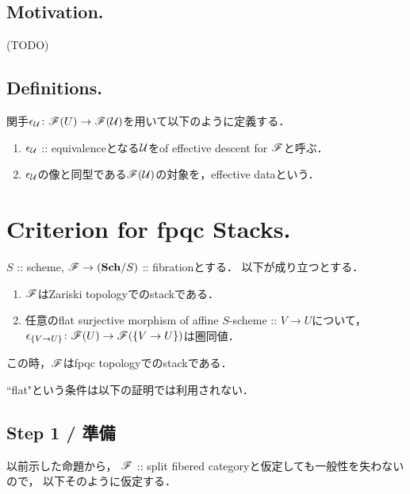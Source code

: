 \documentclass[a4paper, dvipdfmx]{jsarticle}
\begin{document}
\subsection{Motivation.}
    (TODO)

\subsection{Definitions.}
\begin{Def}
    関手$\epsilon_{\mathcal{U}} \colon \mathscr{F}(U) \to \mathscr{F}(\mathcal{U})$を用いて以下のように定義する．
    \begin{enumerate}[label=(\roman*)]
        \item
            $\epsilon_{\mathcal{U}}$ :: equivalenceとなる$\mathcal{U}$をof effective descent for $\mathscr{F}$と呼ぶ．
        \item
            $\epsilon_{\mathcal{U}}$の像と同型である$\mathscr{F}(\mathcal{U})$の対象を，effective dataという．
    \end{enumerate}
\end{Def}

\section{Criterion for fpqc Stacks.}
\begin{Thm}\label{thm:fpqccriterion}
    $S$ :: scheme,
    $\mathscr{F} \to (\mathbf{Sch}/S)$ :: fibrationとする．
    以下が成り立つとする．
    \begin{enumerate}[label=(\alph*)]
        \item $\mathscr{F}$はZariski topologyでのstackである．
        \item
            任意のflat surjective morphism of affine $S$-scheme :: $V \to U$について，\mnewline
            $\epsilon_{\{V \to U\}} \colon \mathscr{F}(U) \to \mathscr{F}(\{V \to U\})$は圏同値．
    \end{enumerate}
    この時，$\mathscr{F}$はfpqc topologyでのstackである．
\end{Thm}

\begin{Remark}
    ``flat"という条件は以下の証明では利用されない．
\end{Remark}

\subsection{Step 1 / 準備}
以前示した命題から，
$\mathscr{F}$ :: split fibered categoryと仮定しても一般性を失わないので，
以下そのように仮定する．
\end{document}
